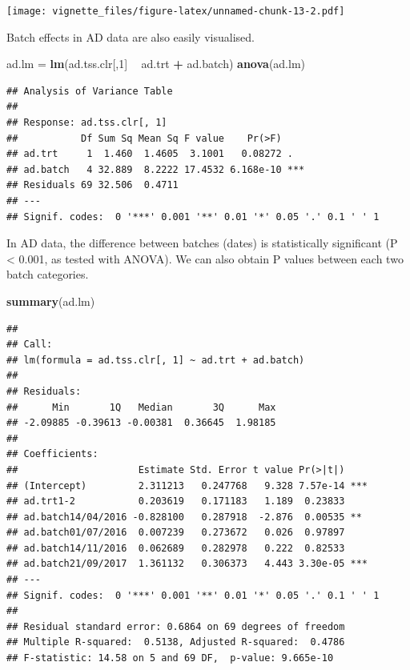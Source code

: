 \documentclass[]{book}
\newenvironment{Shaded}{\begin{snugshade}}{\end{snugshade}}
\newcommand{\KeywordTok}[1]{\textcolor[rgb]{0.13,0.29,0.53}{\textbf{#1}}}
\newcommand{\DecValTok}[1]{\textcolor[rgb]{0.00,0.00,0.81}{#1}}
\newcommand{\StringTok}[1]{\textcolor[rgb]{0.31,0.60,0.02}{#1}}
\newcommand{\OperatorTok}[1]{\textcolor[rgb]{0.81,0.36,0.00}{\textbf{#1}}}
\newcommand{\NormalTok}[1]{#1}
\begin{document}
\texttt{[image: vignette\_files/figure-latex/unnamed-chunk-13-2.pdf]}

Batch effects in AD data are also easily visualised.

\begin{Shaded}
\begin{Highlighting}[]
\NormalTok{ad.lm =}\StringTok{ }\KeywordTok{lm}\NormalTok{(ad.tss.clr[,}\DecValTok{1}\NormalTok{] }\OperatorTok{~}\StringTok{ }\NormalTok{ad.trt }\OperatorTok{+}\StringTok{ }\NormalTok{ad.batch)}
\KeywordTok{anova}\NormalTok{(ad.lm)}
\end{Highlighting}
\end{Shaded}

\begin{verbatim}
## Analysis of Variance Table
## 
## Response: ad.tss.clr[, 1]
##           Df Sum Sq Mean Sq F value    Pr(>F)    
## ad.trt     1  1.460  1.4605  3.1001   0.08272 .  
## ad.batch   4 32.889  8.2222 17.4532 6.168e-10 ***
## Residuals 69 32.506  0.4711                      
## ---
## Signif. codes:  0 '***' 0.001 '**' 0.01 '*' 0.05 '.' 0.1 ' ' 1
\end{verbatim}

In AD data, the difference between batches (dates) is statistically
significant (P \textless{} 0.001, as tested with ANOVA). We can also
obtain P values between each two batch categories.

\begin{Shaded}
\begin{Highlighting}[]
\KeywordTok{summary}\NormalTok{(ad.lm)}
\end{Highlighting}
\end{Shaded}

\begin{verbatim}
## 
## Call:
## lm(formula = ad.tss.clr[, 1] ~ ad.trt + ad.batch)
## 
## Residuals:
##      Min       1Q   Median       3Q      Max 
## -2.09885 -0.39613 -0.00381  0.36645  1.98185 
## 
## Coefficients:
##                     Estimate Std. Error t value Pr(>|t|)    
## (Intercept)         2.311213   0.247768   9.328 7.57e-14 ***
## ad.trt1-2           0.203619   0.171183   1.189  0.23833    
## ad.batch14/04/2016 -0.828100   0.287918  -2.876  0.00535 ** 
## ad.batch01/07/2016  0.007239   0.273672   0.026  0.97897    
## ad.batch14/11/2016  0.062689   0.282978   0.222  0.82533    
## ad.batch21/09/2017  1.361132   0.306373   4.443 3.30e-05 ***
## ---
## Signif. codes:  0 '***' 0.001 '**' 0.01 '*' 0.05 '.' 0.1 ' ' 1
## 
## Residual standard error: 0.6864 on 69 degrees of freedom
## Multiple R-squared:  0.5138, Adjusted R-squared:  0.4786 
## F-statistic: 14.58 on 5 and 69 DF,  p-value: 9.665e-10
\end{verbatim}
\end{document}
